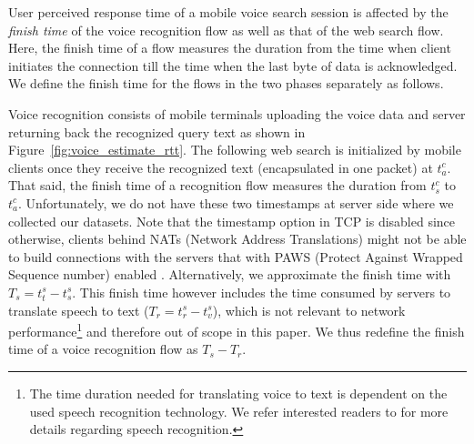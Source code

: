 
User perceived response time of a mobile voice search session is affected by the \emph{finish time} of the voice recognition flow as well as that of the web search flow. Here, the finish time of a flow measures the duration from the time when client initiates the connection till the time when the last byte of data is acknowledged. We define the finish time for the flows in the two phases separately as follows.

Voice recognition consists of mobile terminals uploading the voice data and server returning back the recognized query text as shown in Figure~\ref{fig:voice_estimate_rtt}. The following web search is initialized by mobile clients once they receive the recognized text (encapsulated in one packet) at $t^c_a$. That said, the finish time of a recognition flow measures the duration from $t^c_s$ to $t^c_a$. Unfortunately, we do not have these two timestamps at server side where we collected our datasets. Note that the timestamp option in TCP is disabled since otherwise, clients behind NATs (Network Address Translations) might not be able to build connections with the servers that with PAWS (Protect Against Wrapped Sequence number) \cite{rfc7323} enabled \cite{Wang:2011:USM:2018436.2018479}. Alternatively, we approximate the finish time with $T_s=t^s_t - t^s_s$. This finish time however includes the time consumed by servers to translate speech to text ($T_r=t^s_r - t^s_v$), which is not relevant to network performance\footnote{The time duration needed for translating voice to text is dependent on the used speech recognition technology. We refer interested readers to \cite{36463,schalkwyk2010your} for more details regarding speech recognition.} and therefore out of scope in this paper. We thus redefine the finish time of a voice recognition flow as $T_s-T_r$.


